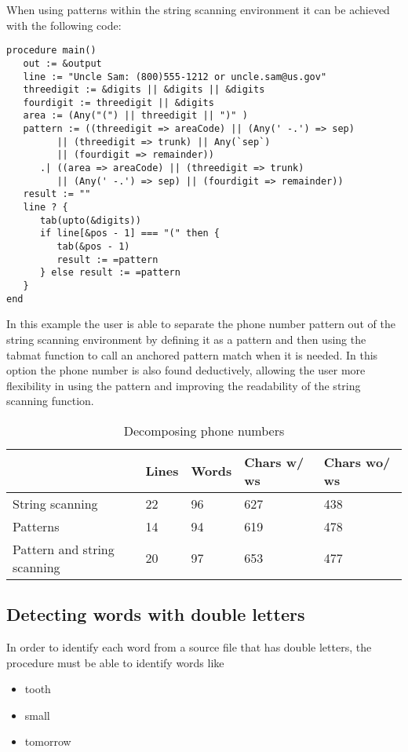 \documentclass{article}
\begin{document}
When using patterns within the string scanning environment it can be achieved with the following code:
\begin{verbatim}
procedure main()
   out := &output
   line := "Uncle Sam: (800)555-1212 or uncle.sam@us.gov"
   threedigit := &digits || &digits || &digits
   fourdigit := threedigit || &digits
   area := (Any("(") || threedigit || ")" )
   pattern := ((threedigit => areaCode) || (Any(' -.') => sep) 
         || (threedigit => trunk) || Any(`sep`) 
         || (fourdigit => remainder))
      .| ((area => areaCode) || (threedigit => trunk) 
         || (Any(' -.') => sep) || (fourdigit => remainder))
   result := ""
   line ? {
      tab(upto(&digits))
      if line[&pos - 1] === "(" then {
         tab(&pos - 1)
         result := =pattern
      } else result := =pattern
   }
end
\end{verbatim}
In this example the user is able to separate the phone number pattern out of the string scanning environment by defining it as a pattern and then using the tabmat function to call an anchored pattern match when it is needed.  In this option the phone number is also found deductively, allowing the user more flexibility in using the pattern and improving the readability of the string scanning function.

\begin{table}[ht]
	\caption{Decomposing phone numbers}
	\centering
	\begin{tabular}{|l|l|l|l|l|}
		\hline\hline
		 & Lines & Words & Chars w/ ws & Chars wo/ ws\\
		\hline
		String scanning & 22 & 96 & 627 & 438 \\
		Patterns & 14 & 94 & 619 & 478 \\
		Pattern and string scanning & 20 & 97 & 653 & 477 \\
		\hline
	\end{tabular}
\end{table}

\subsection{Detecting words with double letters}
In order to identify each word from a source file that has double letters, the procedure must be able to identify words like
\begin{itemize}
\item tooth
\item small
\item tomorrow
\end{itemize}
\end{document}

